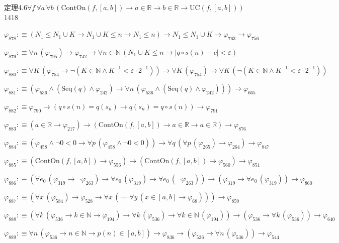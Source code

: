 \begin{fullproof}{定理4.6}{$\forall f\,\forall a\,\forall b\,(\mathrm{ContOn}(f,[a,b]) \to a \in \mathbb{R} \to b \in \mathbb{R} \to \mathrm{UC}(f,[a,b]))$}{1418}
\begin{abbrevlist}
\item $\varphi_{878} :\equiv (N_{1} \leq N_{1} \cup K \to N_{1} \cup K \leq n \to N_{1} \leq n) \to N_{1} \leq N_{1} \cup K \to \varphi_{763} \to \varphi_{756}$
\item $\varphi_{879} :\equiv \forall n\,(\varphi_{795}) \to \varphi_{742} \to \forall n \in \mathbb{N}\,(N_{1} \cup K \leq n \to \lvert q \circ s(n) - c \rvert < \varepsilon)$
\item $\varphi_{880} :\equiv \forall K\,(\varphi_{754} \to \neg (K \in \mathbb{N} \land \underline{K}^{-1} < \varepsilon \cdot 2^{-1})) \to \forall K\,(\varphi_{754}) \to \forall K\,(\neg (K \in \mathbb{N} \land \underline{K}^{-1} < \varepsilon \cdot 2^{-1}))$
\item $\varphi_{881} :\equiv (\varphi_{536} \land (\mathrm{Seq}(q) \land \varphi_{242}) \to \forall n\,(\varphi_{536} \land (\mathrm{Seq}(q) \land \varphi_{242}))) \to \varphi_{665}$
\item $\varphi_{882} :\equiv \varphi_{790} \to (q \circ s(n) = q(s_{n}) \to q(s_{n}) = q \circ s(n)) \to \varphi_{791}$
\item $\varphi_{883} :\equiv (a \in \mathbb{R} \to \varphi_{217}) \to (\mathrm{ContOn}(f,[a,b]) \to a \in \mathbb{R} \to a \in \mathbb{R}) \to \varphi_{876}$
\item $\varphi_{884} :\equiv (\varphi_{458} \land \neg 0 < 0 \to \forall p\,(\varphi_{458} \land \neg 0 < 0)) \to \forall q\,(\forall p\,(\varphi_{265}) \to \varphi_{264}) \to \varphi_{847}$
\item $\varphi_{885} :\equiv (\mathrm{ContOn}(f,[a,b]) \to \varphi_{556}) \to (\mathrm{ContOn}(f,[a,b]) \to \varphi_{560}) \to \varphi_{851}$
\item $\varphi_{886} :\equiv (\forall e_{0}\,(\varphi_{319} \to \neg \varphi_{263}) \to \forall e_{0}\,(\varphi_{319}) \to \forall e_{0}\,(\neg \varphi_{263})) \to (\varphi_{319} \to \forall e_{0}\,(\varphi_{319})) \to \varphi_{860}$
\item $\varphi_{887} :\equiv (\forall x\,(\varphi_{584}) \to \varphi_{528} \to \forall x\,(\neg \neg \forall y\,(x \in [a,b] \to \varphi_{68}))) \to \varphi_{859}$
\item $\varphi_{888} :\equiv (\forall k\,(\varphi_{536} \to k \in \mathbb{N} \to \varphi_{194}) \to \forall k\,(\varphi_{536}) \to \forall k \in \mathbb{N}\,(\varphi_{194})) \to (\varphi_{536} \to \forall k\,(\varphi_{536})) \to \varphi_{640}$
\item $\varphi_{889} :\equiv \forall n\,(\varphi_{536} \to n \in \mathbb{N} \to p(n) \in [a,b]) \to \varphi_{836} \to (\varphi_{536} \to \forall n\,(\varphi_{536})) \to \varphi_{544}$

\end{abbrevlist}
\end{fullproof}
